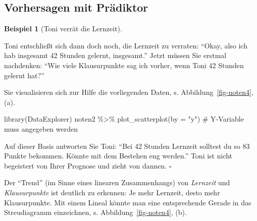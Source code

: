 \documentclass[
  letterpaper,
  oneside,
  open=any]{scrbook}
\newenvironment{Shaded}{\begin{snugshade}}{\end{snugshade}}
\newcommand{\AttributeTok}[1]{\textcolor[rgb]{0.40,0.45,0.13}{#1}}
\newcommand{\CommentTok}[1]{\textcolor[rgb]{0.37,0.37,0.37}{#1}}
\newcommand{\FunctionTok}[1]{\textcolor[rgb]{0.28,0.35,0.67}{#1}}
\newcommand{\NormalTok}[1]{\textcolor[rgb]{0.00,0.23,0.31}{#1}}
\newcommand{\SpecialCharTok}[1]{\textcolor[rgb]{0.37,0.37,0.37}{#1}}
\newcommand{\StringTok}[1]{\textcolor[rgb]{0.13,0.47,0.30}{#1}}
\theoremstyle{definition}
\theoremstyle{definition}
\newtheorem{example}{Beispiel}[chapter]
\theoremstyle{definition}
\theoremstyle{remark}
\begin{document}
\subsection{Vorhersagen mit
Prädiktor}\label{vorhersagen-mit-pruxe4diktor}

\begin{example}[Toni verrät die
Lernzeit]\protect\hypertarget{exm-noten3}{}\label{exm-noten3}

Toni entschließt sich dann doch noch, die Lernzeit zu verraten:
\enquote{Okay, also ich hab insgesamt 42 Stunden gelernt, insgesamt.}
Jetzt müssen Sie erstmal nachdenken: \enquote{Wie viele Klausurpunkte
sag ich vorher, wenn Toni 42 Stunden gelernt hat?}

Sie visualisieren sich zur Hilfe die vorliegenden Daten, s.
Abbildung~\ref{fig-noten4}, (a).

\begin{Shaded}
\begin{Highlighting}[]
\FunctionTok{library}\NormalTok{(DataExplorer)}
\NormalTok{noten2 }\SpecialCharTok{\%\textgreater{}\%} 
  \FunctionTok{plot\_scatterplot}\NormalTok{(}\AttributeTok{by =} \StringTok{"y"}\NormalTok{)  }\CommentTok{\# Y{-}Variable muss angegeben werden}
\end{Highlighting}
\end{Shaded}

Auf dieser Basis antworten Sie Toni: \enquote{Bei 42 Stunden Lernzeit
solltest du so 83 Punkte bekommen. Könnte mit dem Bestehen eng werden.}
Toni ist nicht begeistert von Ihrer Prognose und zieht von dannen.
\(\square\)

\end{example}

Der \enquote{Trend} (im Sinne eines linearen Zusammenhangs) von
\emph{Lernzeit} und \emph{Klausurpunkte} ist deutlich zu erkennen: Je
mehr Lernzeit, desto mehr Klausurpunkte. Mit einem Lineal könnte man
eine entsprechende Gerade in das Streudiagramm einzeichnen, s.
Abbildung~\ref{fig-noten4}, (b).
\end{document}
